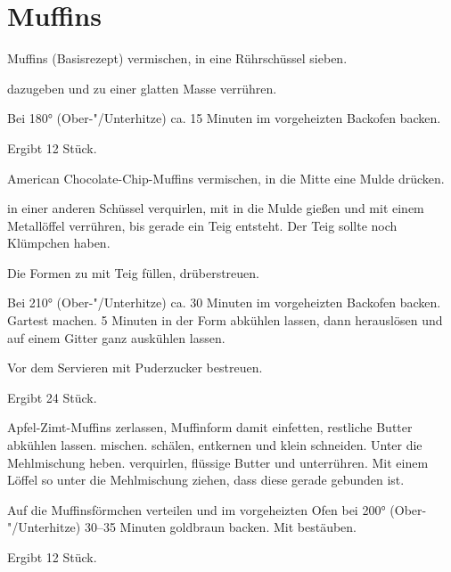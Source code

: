 \section{Muffins}

\begin{recipe}{Muffins (Basisrezept)}
  vermischen, in eine Rührschüssel sieben.
  
  dazugeben und zu einer glatten Masse verrühren.

  Bei 180° (Ober-"/Unterhitze) ca. 15 Minuten im vorgeheizten
  Backofen backen.
  
  Ergibt 12 Stück.
\end{recipe}
  
\begin{recipe}{American Chocolate-Chip-Muffins}
  vermischen, in die Mitte eine Mulde drücken.

  in einer anderen Schüssel verquirlen, mit
  in die Mulde gießen und mit einem Metallöffel verrühren, bis gerade
  ein Teig entsteht. Der Teig sollte noch Klümpchen haben.
  
  Die Formen zu  mit Teig füllen,
  drüberstreuen.

  Bei 210° (Ober-"/Unterhitze) ca. 30 Minuten im vorgeheizten
  Backofen backen. Gartest machen. 5 Minuten in der Form
  abkühlen lassen, dann herauslösen und auf einem Gitter ganz
  auskühlen lassen.

  Vor dem Servieren mit Puderzucker bestreuen.
  
  Ergibt 24 Stück.
\end{recipe}

\begin{recipe}{Apfel-Zimt-Muffins}
  zerlassen, Muffinform damit einfetten, restliche Butter abkühlen
  lassen.
  mischen.
  schälen, entkernen und klein schneiden. Unter die Mehlmischung heben.
  verquirlen, flüssige Butter und
  unterrühren. Mit einem Löffel so unter die Mehlmischung ziehen, dass
  diese gerade gebunden ist.

  Auf die Muffinsförmchen verteilen und im vorgeheizten Ofen bei 200°
  (Ober-"/Unterhitze) 30–35 Minuten goldbraun backen. Mit
  bestäuben.
  
  Ergibt 12 Stück.
\end{recipe}


